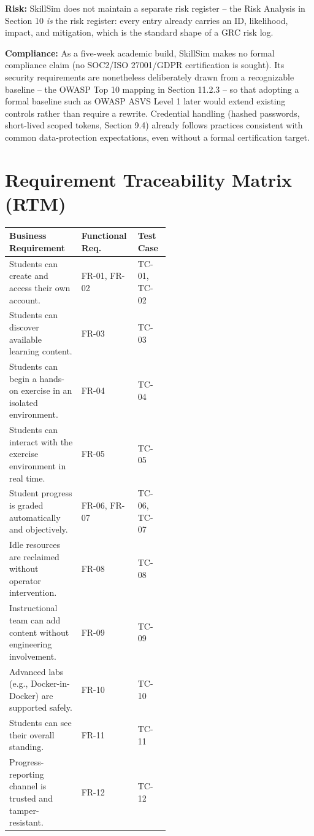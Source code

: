 \documentclass[11pt]{article}
\begin{document}
\textbf{Risk:} SkillSim does not maintain a separate risk register --
the Risk Analysis in Section 10 \emph{is} the risk register: every
entry already carries an ID, likelihood, impact, and mitigation, which
is the standard shape of a GRC risk log.

\textbf{Compliance:} As a five-week academic build, SkillSim makes no
formal compliance claim (no SOC2/ISO 27001/GDPR certification is
sought). Its security requirements are nonetheless deliberately drawn
from a recognizable baseline -- the OWASP Top 10 mapping in Section
11.2.3 -- so that adopting a formal baseline such as OWASP ASVS Level
1 later would extend existing controls rather than require a rewrite.
Credential handling (hashed passwords, short-lived scoped tokens,
Section 9.4) already follows practices consistent with common
data-protection expectations, even without a formal certification
target.

\section{Requirement Traceability Matrix (RTM)}

\begin{longtable}{@{}p{0.30\linewidth}p{0.10\linewidth}p{0.12\linewidth}@{}}
\toprule
\textbf{Business Requirement} & \textbf{Functional Req.} & \textbf{Test Case} \\
\midrule
\endhead
Students can create and access their own account. & FR-01, FR-02 & TC-01, TC-02 \\
Students can discover available learning content. & FR-03 & TC-03 \\
Students can begin a hands-on exercise in an isolated environment. & FR-04 & TC-04 \\
Students can interact with the exercise environment in real time. & FR-05 & TC-05 \\
Student progress is graded automatically and objectively. & FR-06, FR-07 & TC-06, TC-07 \\
Idle resources are reclaimed without operator intervention. & FR-08 & TC-08 \\
Instructional team can add content without engineering involvement. & FR-09 & TC-09 \\
Advanced labs (e.g., Docker-in-Docker) are supported safely. & FR-10 & TC-10 \\
Students can see their overall standing. & FR-11 & TC-11 \\
Progress-reporting channel is trusted and tamper-resistant. & FR-12 & TC-12 \\
\bottomrule
\end{longtable}
\end{document}
